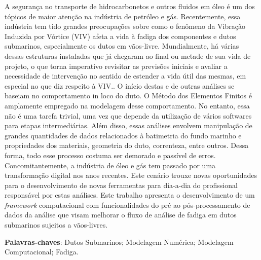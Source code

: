 
\setlength{\absparsep}{18pt} %
\begin{resumo}

    A segurança no transporte de hidrocarbonetos e outros fluidos em óleo é um dos tópicos de maior atenção na indústria de petróleo e gás.
    Recentemente, essa indústria tem tido grandes preocupações sobre como o fenômeno da Vibração Induzida por Vórtice (VIV) afeta a vida à fadiga dos componentes e dutos submarinos, especialmente os dutos em vãos-livre.
    Mundialmente, há várias dessas estruturas instaladas que já chegaram ao final ou metade de sua vida de projeto, o que torna imperativo revisitar as previsões iniciais e avaliar a necessidade de intervenção no sentido de estender a vida útil das mesmas, em especial no que diz respeito à VIV..
    O início destas e de outras análises se baseiam no comportamento in loco do duto.
    O Método dos Elementos Finitos é amplamente empregado na modelagem desse comportamento.
    No entanto, essa não é uma tarefa trivial, uma vez que depende da utilização de vários softwares para etapas intermediárias.
    Além disso, essas análises envolvem manipulação de grandes quantidades de dados relacionados à batimetria do fundo marinho e propriedades dos materiais, geometria do duto, correnteza, entre outros.
    Dessa forma, todo esse processo costuma ser demorado e passível de erros.
    Concomitantemente, a indústria de óleo e gás tem passado por uma transformação digital nos anos recentes.
    Este cenário trouxe novas oportunidades para o desenvolvimento de novas ferramentas para dia-a-dia do profissional responsável por estas análises.
    Este trabalho apresenta o desenvolvimento de um \textit{framework} computacional com funcionalidades do pré ao pós-processamento de dados da análise que visam melhorar o fluxo de análise de fadiga em dutos submarinos sujeitos a vãos-livres.



 \textbf{Palavras-chaves}: Dutos Submarinos; Modelagem Numérica; Modelagem Computacional; Fadiga.
\end{resumo}

